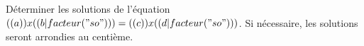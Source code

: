 \exercice

Déterminer les solutions de l'équation $(( a )) x (( b|facteur("so") ))= (( c )) x (( d|facteur("so") ))$.
Si nécessaire, les solutions seront arrondies au centième.
